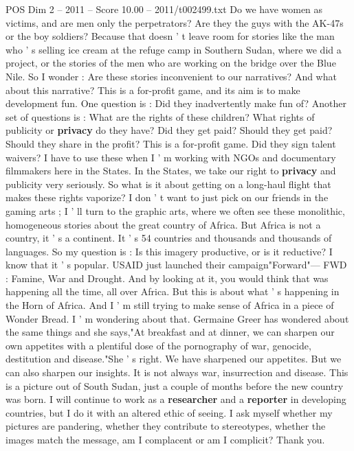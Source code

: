 \begin{textsample}{POS Dim 2 – 2011 – Score 10.00 – 2011/t002499.txt}
Do we have women as victims, and are men only the perpetrators?
Are they the guys with the AK-47s or the boy soldiers?
Because that doesn ' t leave room for stories like the man who ' s selling ice cream at the refuge camp in Southern Sudan, where we did a project, or the stories of the men who are working on the bridge over the Blue Nile.
So I wonder : Are these stories inconvenient to our narratives?
And what about this narrative?
This is a for-profit game, and its aim is to make development fun.
One question is : Did they inadvertently make fun of?
Another set of questions is : What are the rights of these children?
What rights of publicity or \textbf{privacy} do they have?
Did they get paid?
Should they get paid?
Should they share in the profit?
This is a for-profit game.
Did they sign talent waivers?
I have to use these when I ' m working with NGOs and documentary filmmakers here in the States.
In the States, we take our right to \textbf{privacy} and publicity very seriously.
So what is it about getting on a long-haul flight that makes these rights vaporize?
I don ' t want to just pick on our friends in the gaming arts ; I ' ll turn to the graphic arts, where we often see these monolithic, homogeneous stories about the great country of Africa.
But Africa is not a country, it ' s a continent.
It ' s 54 countries and thousands and thousands of languages.
So my question is : Is this imagery productive, or is it reductive?
I know that it ' s popular.
USAID just launched their campaign"Forward"— FWD : Famine, War and Drought.
And by looking at it, you would think that was happening all the time, all over Africa.
But this is about what ' s happening in the Horn of Africa.
And I ' m still trying to make sense of Africa in a piece of Wonder Bread.
I ' m wondering about that.
Germaine Greer has wondered about the same things and she says,"At breakfast and at dinner, we can sharpen our own appetites with a plentiful dose of the pornography of war, genocide, destitution and disease."She ' s right.
We have sharpened our appetites.
But we can also sharpen our insights.
It is not always war, insurrection and disease.
This is a picture out of South Sudan, just a couple of months before the new country was born.
I will continue to work as a \textbf{researcher} and a \textbf{reporter} in developing countries, but I do it with an altered ethic of seeing.
I ask myself whether my pictures are pandering, whether they contribute to stereotypes, whether the images match the message, am I complacent or am I complicit?
Thank you.

\end{textsample}
